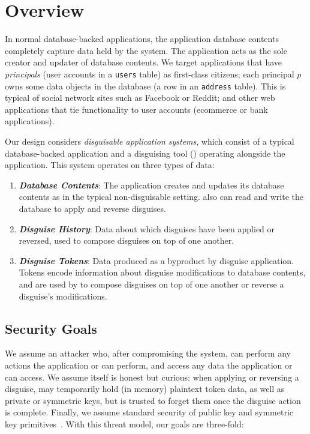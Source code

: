 \section{Overview}
In normal database-backed applications, the application database contents completely capture data
held by the system. The application acts as the sole creator and updater of database contents. We  
target applications that have \emph{principals} (\ie user accounts in a \texttt{users} table) as first-class citizens; each principal $p$ owns some data objects in the database (\eg a row in an \texttt{address} table).
This is typical of social network sites such as Facebook or Reddit; and other web applications that
tie functionality to user accounts (\eg ecommerce or bank applications).

Our design considers \emph{disguisable application systems}, which consist of a typical database-backed
application and a disguising tool (\sys) operating alongside the application. This system operates
on three types of data:
\begin{enumerate}
    \item \emph{\textbf{Database Contents}}: The application creates and updates its database
        contents as in the typical non-disguisable setting. \sys also can read and write
        the database to apply and reverse disguises.
    \item \emph{\textbf{Disguise History}}: Data about which disguises have been applied or
        reversed, used to compose disguises on top of one another.
    \item \emph{\textbf{Disguise Tokens}}: Data produced as a byproduct by disguise application.
        Tokens encode information about disguise modifications to database contents, and are used by
        \sys to compose disguises on top of one another or reverse a disguise's modifications.
\end{enumerate}

\subsection{Security Goals}
We assume an attacker who, after compromising the system, can perform any actions the
application or \sys can perform, and access any data the application or \sys can access.
We assume \sys itself is honest but curious: when applying or reversing a disguise, \sys may temporarily
hold (in memory) plaintext token data, as well as private or symmetric keys, but is trusted to
forget them once the disguise action is complete. 
Finally, we assume standard security of public key and symmetric key primitives~.
With this threat model, our goals are three-fold: 

